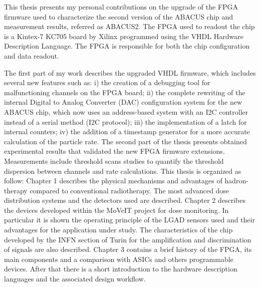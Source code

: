 \newpage
\thispagestyle{plain}
\noindent This thesis presents my personal contributions on the upgrade of the FPGA firmware used to characterize
the second version of the ABACUS chip and measurement results, referred as ABACUS2.
The FPGA used to readout the chip is a Kintex-7 KC705 board by Xilinx programmed using the VHDL Hardware Description Language.
The FPGA is responsible for both the chip configuration and data readout.

\noindent The first part of my work describes the upgraded VHDL firmware, which includes several new features such as:
i) the creation of a debugging tool for malfunctioning channels on the FPGA board;
ii) the complete rewriting of the internal Digital to Analog Converter (DAC) configuration system for the new ABACUS chip, which
now uses an address-based system with an I2C controller instead of a serial method (I2C protocol);
iii) the implementation of a latch for internal counters;
iv) the addition of a timestamp generator for a more accurate calculation of the particle rate.
\newline
The second part of the thesis presents obtained experimental results that validated the new FPGA firmware extensions.
Measurements include threshold scans studies to quantify the threshold dispersion between channels and rate calculations.
\vspace{1cm}
\newline
This thesis is organized as follow:
\vspace{0.25cm}
\newline
Chapter 1 describes the physical mechanisms and advantages of hadron-therapy compared to conventional radiotherapy. The most advanced dose distribution systems and the detectors used are described.
\vspace{0.25cm}
\newline
Chapter 2 describes the devices developed within the MoVeIT project for dose monitoring.
In particular it is shown the operating principle of the LGAD sensors used and their advantages for the application under study.
The characteristics of the chip developed by the INFN section of Turin for the amplification and discrimination of signals are also described.
\vspace{0.25cm}
\newline
Chapter 3 contains a brief history of the FPGA, its main components and a comparison with ASICs and others programmable devices.
After that there is a short introduction to the hardware description languages and the associated design workflow.

